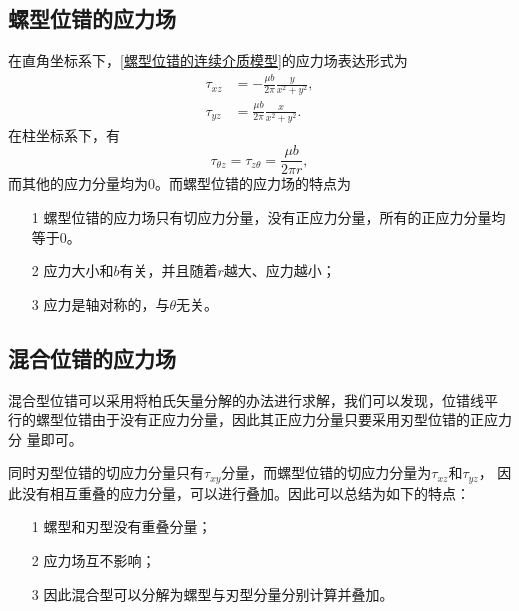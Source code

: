             \subsection{螺型位错的应力场}
                在直角坐标系下，\autoref{螺型位错的连续介质模型}的应力场表达形式为
                \begin{align} 
                    \tau_{x z} &=-\frac{\mu b}{2 \pi} \frac{y}{x^{2}+y^{2}}, \\
                    \tau_{y z} &=\frac{\mu b}{2 \pi} \frac{x}{x^{2}+y^{2}}. 
                \end{align}
                在柱坐标系下，有
                \begin{equation}
                    \tau_{\theta z}=\tau_{z\theta}=\frac{\mu b}{2\pi r},
                \end{equation}
                而其他的应力分量均为0。而螺型位错的应力场的特点为
                \begin{itemize}
                    \item[1]  螺型位错的应力场只有切应力分量，没有正应力分量，所有的正应力分量均等于0。
                    \item[2] 应力大小和$b$有关，并且随着$r$越大、应力越小；
                    \item[3] 应力是轴对称的，与$θ$无关。
                \end{itemize}
            \subsection{混合位错的应力场}
                混合型位错可以采用将柏氏矢量分解的办法进行求解，我们可以发现，位错线平
                行的螺型位错由于没有正应力分量，因此其正应力分量只要采用刃型位错的正应力分
                量即可。
                
                同时刃型位错的切应力分量只有$\tau_{xy}$分量，而螺型位错的切应力分量为$\tau_{xz}$和$\tau_{yz}$，
                因此没有相互重叠的应力分量，可以进行叠加。因此可以总结为如下的特点：
                \begin{itemize}
                    \item[1] 螺型和刃型没有重叠分量；
                    \item[2] 应力场互不影响；
                    \item[3] 因此混合型可以分解为螺型与刃型分量分别计算并叠加。
                \end{itemize}
